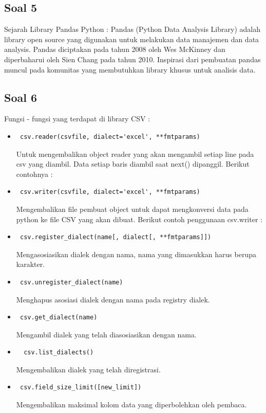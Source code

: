 \subsection{Soal 5}
Sejarah Library Pandas Python : 
Pandas (Python Data Analysis Library) adalah library open source yang digunakan untuk melakukan data manajemen dan data analysis. Pandas diciptakan pada tahun 2008 oleh Wes McKinney dan diperbaharui oleh Sien Chang pada tahun 2010. Inspirasi dari pembuatan pandas muncul pada komunitas yang membutuhkan library khusus untuk analisis data. 
\subsection{Soal 6}
Fungsi - fungsi yang terdapat di library CSV : 
\begin{itemize}
	\item \begin{verbatim} csv.reader(csvfile, dialect='excel', **fmtparams) \end{verbatim} Untuk mengembalikan	object reader yang akan mengambil setiap line pada csv yang diambil. Data setiap baris diambil saat next() dipanggil. Berikut contohnya : 
	\item \begin{verbatim} csv.writer(csvfile, dialect='excel', **fmtparams) \end{verbatim} Mengembalikan file pembuat object untuk dapat mengkonversi data pada python ke file CSV yang akan dibuat. Berikut contoh penggunaan csv.writer : 
	\item \begin{verbatim} csv.register_dialect(name[, dialect[, **fmtparams]]) \end{verbatim} Mengasosiasikan dialek dengan nama, nama yang dimasukkan harus berupa karakter.
	\item \begin{verbatim} csv.unregister_dialect(name) \end{verbatim}
	Menghapus asosiasi dialek dengan nama pada registry dialek.
	\item \begin{verbatim} csv.get_dialect(name) \end{verbatim}
	Mengambil dialek yang telah diasosiasikan dengan nama. 
	\item \begin{verbatim}  csv.list_dialects() \end{verbatim} Mengembalikan dialek yang telah diregistrasi.
	\item \begin{verbatim} csv.field_size_limit([new_limit]) \end{verbatim} Mengembalikan maksimal kolom data yang diperbolehkan oleh pembaca.
\end{itemize}
